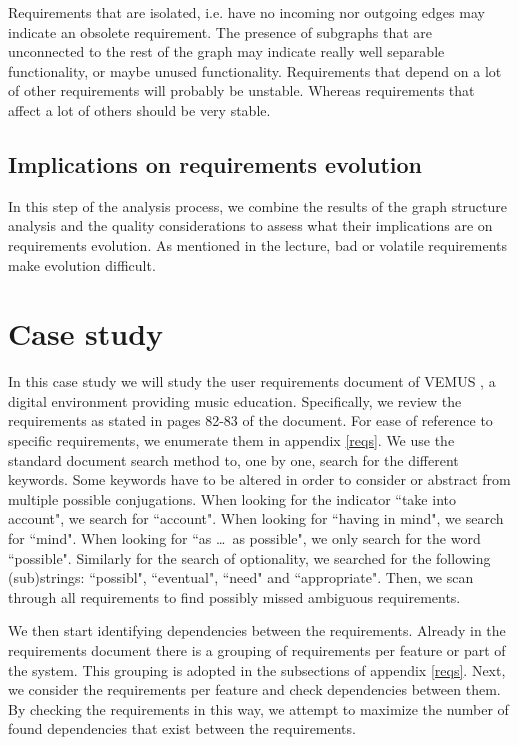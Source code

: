 \documentclass[a4paper,twoside, twocolumn,11pt]{article}
\numberwithin{equation}{section}
\begin{document}
Requirements that are isolated, i.e. have no incoming nor outgoing edges may indicate an obsolete requirement. The presence of subgraphs that are unconnected to the rest of the graph may indicate really well separable functionality, or maybe unused functionality. Requirements that depend on a lot of other requirements will probably be unstable. Whereas requirements that affect a lot of others should be very stable. 

\subsection{Implications on requirements evolution}
In this step of the analysis process, we combine the results of the graph structure analysis and the quality considerations to assess what their implications are on requirements evolution. As mentioned in the lecture, bad or volatile requirements make evolution difficult.

\section{Case study}
In this case study we will study the user requirements document of VEMUS \cite{VEMUS}, a digital environment providing music education. Specifically, we review the requirements as stated in pages 82-83 of the document. For ease of reference to specific requirements, we enumerate them in appendix \ref{reqs}. We use the standard document search method to, one by one, search for the different keywords. Some keywords have to be altered in order to consider or abstract from multiple possible conjugations. When looking for the indicator ``take into account", we search for ``account". When looking for ``having in mind", we search for ``mind". When looking for ``as \ldots\ as possible", we only search for the word ``possible". Similarly for the search of optionality, we searched for the following (sub)strings: ``possibl", ``eventual", ``need" and ``appropriate". 
Then, we scan through all requirements to find possibly missed ambiguous requirements.

We then start identifying dependencies between the requirements. Already in the requirements document \cite{VEMUS} there is a grouping of requirements per feature or part of the system. This grouping is adopted in the subsections of appendix \ref{reqs}.
Next, we consider the requirements per feature and check dependencies between them. By checking the requirements in this way, we attempt to maximize the number of found dependencies that exist between the requirements.
\end{document}
